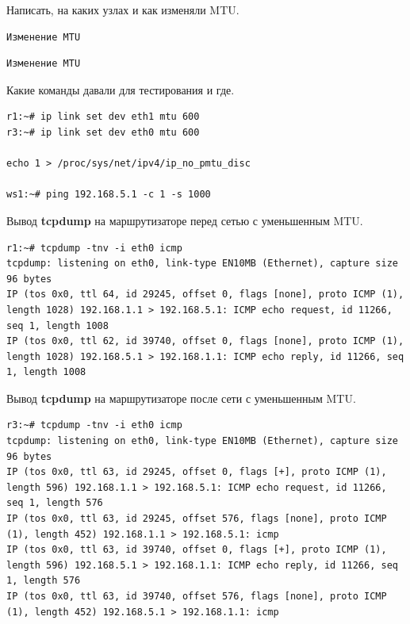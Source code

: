 \documentclass[a4paper,12pt]{article}
\begin{document}
Написать, на каких узлах и как изменяли MTU.

\begin{Verbatim}
Изменение MTU
\end{Verbatim}

\begin{Verbatim}
Изменение MTU
\end{Verbatim}


Какие команды давали для тестирования и где.

\begin{Verbatim}
r1:~# ip link set dev eth1 mtu 600
r3:~# ip link set dev eth0 mtu 600

echo 1 > /proc/sys/net/ipv4/ip_no_pmtu_disc

ws1:~# ping 192.168.5.1 -c 1 -s 1000
\end{Verbatim}

Вывод \textbf{tcpdump} на маршрутизаторе перед сетью с уменьшенным MTU.


\begin{Verbatim}
r1:~# tcpdump -tnv -i eth0 icmp
tcpdump: listening on eth0, link-type EN10MB (Ethernet), capture size 96 bytes
IP (tos 0x0, ttl 64, id 29245, offset 0, flags [none], proto ICMP (1), length 1028) 192.168.1.1 > 192.168.5.1: ICMP echo request, id 11266, seq 1, length 1008
IP (tos 0x0, ttl 62, id 39740, offset 0, flags [none], proto ICMP (1), length 1028) 192.168.5.1 > 192.168.1.1: ICMP echo reply, id 11266, seq 1, length 1008
\end{Verbatim}

Вывод \textbf{tcpdump} на маршрутизаторе после сети с уменьшенным MTU.


\begin{Verbatim}
r3:~# tcpdump -tnv -i eth0 icmp
tcpdump: listening on eth0, link-type EN10MB (Ethernet), capture size 96 bytes
IP (tos 0x0, ttl 63, id 29245, offset 0, flags [+], proto ICMP (1), length 596) 192.168.1.1 > 192.168.5.1: ICMP echo request, id 11266, seq 1, length 576
IP (tos 0x0, ttl 63, id 29245, offset 576, flags [none], proto ICMP (1), length 452) 192.168.1.1 > 192.168.5.1: icmp
IP (tos 0x0, ttl 63, id 39740, offset 0, flags [+], proto ICMP (1), length 596) 192.168.5.1 > 192.168.1.1: ICMP echo reply, id 11266, seq 1, length 576
IP (tos 0x0, ttl 63, id 39740, offset 576, flags [none], proto ICMP (1), length 452) 192.168.5.1 > 192.168.1.1: icmp
\end{Verbatim}
\end{document}
